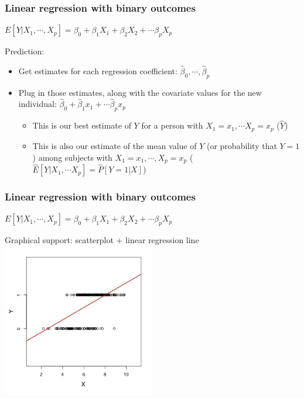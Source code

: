 \documentclass[12pt, 
hyperref={colorlinks=true, linkcolor=blue, urlcolor=cyan}]{beamer}
\begin{document}
\begin{frame}
\frametitle{Linear regression with binary outcomes}
\begin{center} $E[Y|X_1,\cdots,X_p] = \beta_0 + \beta_1 X_1 + \beta_2 X_2 + \cdots \beta_p X_p$ \end{center}

\color{blue} Prediction:\vspace{-0.3cm} \color{black}
\begin{itemize} \itemsep +5pt
\item Get estimates for each regression coefficient: $\hat\beta_0, \cdots, \hat\beta_p$ \pause
\item Plug in those estimates, along with the covariate values for the new individual: $\hat\beta_0 + \hat\beta_1 x_1 + \cdots \hat\beta_p x_p$ \pause
	\begin{itemize} \itemsep +5pt
	\item This is our best estimate of $Y$ for a person with $X_1 = x_1, \cdots X_p = x_p$ ($\hat{Y}$) \pause
	\item This is also our estimate of the mean value of $Y$ (or probability that $Y=1$) among subjects with $X_1 = x_1, \cdots, X_p = x_p$ ($\hat{E}[Y|X_1,\cdots X_p] = \hat{P}[Y=1|X]$)
	\end{itemize}
\end{itemize}

\end{frame}

\begin{frame}
\frametitle{Linear regression with binary outcomes}
\begin{center} $E[Y|X_1,\cdots,X_p] = \beta_0 + \beta_1 X_1 + \beta_2 X_2 + \cdots \beta_p X_p$ \end{center}

\color{blue} Graphical support: \color{black} scatterplot + linear regression line
\vspace{-0.4cm}
\center
\includegraphics[width=0.5\textwidth]{figs/contX-lm}
\end{frame}
\end{document}

